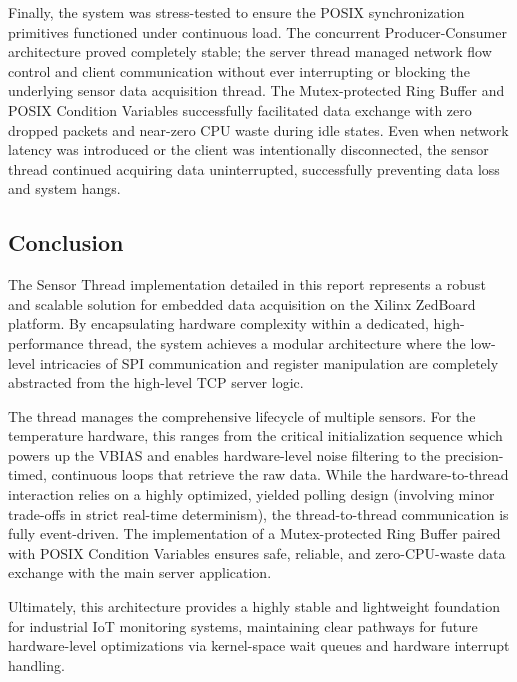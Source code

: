 Finally, the system was stress-tested to ensure the POSIX synchronization primitives functioned under continuous load. The concurrent Producer-Consumer architecture proved completely stable; the server thread managed network flow control and client communication without ever interrupting or blocking the underlying sensor data acquisition thread. The Mutex-protected Ring Buffer and POSIX Condition Variables successfully facilitated data exchange with zero dropped packets and near-zero CPU waste during idle states. Even when network latency was introduced or the client was intentionally disconnected, the sensor thread continued acquiring data uninterrupted, successfully preventing data loss and system hangs.

\subsection{Conclusion}
The Sensor Thread implementation detailed in this report represents a robust
and scalable solution for embedded data acquisition on the Xilinx ZedBoard
platform. By encapsulating hardware complexity within a dedicated,
high-performance thread, the system achieves a modular architecture where the
low-level intricacies of SPI communication and register manipulation are
completely abstracted from the high-level TCP server logic.

The thread manages the comprehensive lifecycle of multiple sensors. For the
temperature hardware, this ranges from the critical initialization sequence
which powers up the VBIAS and enables hardware-level noise filtering to the
precision-timed, continuous loops that retrieve the raw data. While the
hardware-to-thread interaction relies on a highly optimized, yielded polling
design (involving minor trade-offs in strict real-time determinism), the
thread-to-thread communication is fully event-driven. The implementation of a
Mutex-protected Ring Buffer paired with POSIX Condition Variables ensures safe,
reliable, and zero-CPU-waste data exchange with the main server application.

Ultimately, this architecture provides a highly stable and lightweight
foundation for industrial IoT monitoring systems, maintaining clear pathways
for future hardware-level optimizations via kernel-space wait queues and
hardware interrupt handling.